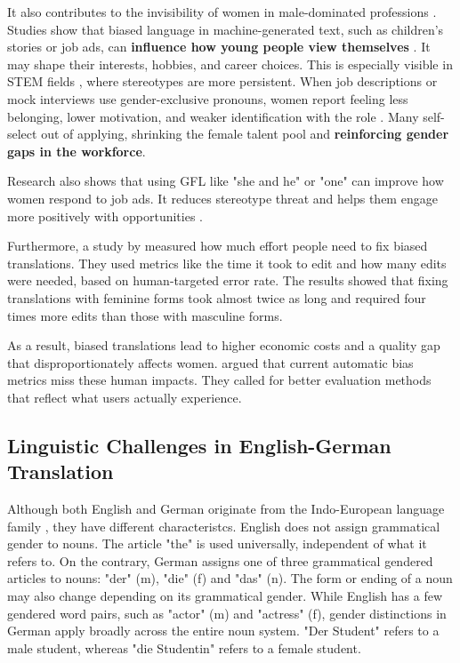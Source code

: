         It also contributes to the invisibility of women in male-dominated professions \citep{kapplAreAllSpanish2025}. Studies show that biased language in machine-generated text, such as children’s stories or job ads, can \textbf{influence how young people view themselves} \citep{soundararajanInvestigatingGenderBias2024,kapplAreAllSpanish2025}. It may shape their interests, hobbies, and career choices. This is especially visible in STEM fields \citep{pratesAssessingGenderBias2019}, where stereotypes are more persistent. When job descriptions or mock interviews use gender-exclusive pronouns, women report feeling less belonging, lower motivation, and weaker identification with the role \citep{godsilEffectsGenderRoles2016}. Many self-select out of applying, shrinking the female talent pool and \textbf{reinforcing gender gaps in the workforce}.

        Research also shows that using GFL like "she and he" or "one" can improve how women respond to job ads. It reduces stereotype threat and helps them engage more positively with opportunities \citep{godsilEffectsGenderRoles2016}.

        Furthermore, a study by \citet{savoldiWhatHarmQuantifying2024} measured how much effort people need to fix biased translations. They used metrics like the time it took to edit and how many edits were needed, based on human-targeted error rate. The results showed that fixing translations with feminine forms took almost twice as long and required four times more edits than those with masculine forms.

        As a result, biased translations lead to higher economic costs and a quality gap that disproportionately affects women. \citeauthor{savoldiWhatHarmQuantifying2024} argued that current automatic bias metrics miss these human impacts. They called for better evaluation methods that reflect what users actually experience.

    \subsection{Linguistic Challenges in English-German Translation}
        Although both English and German originate from the Indo-European language family \citep{baldiEnglishIndoEuropeanLanguage2008}, they have different characteristcs. English does not assign grammatical gender to nouns. The article "the" is used universally, independent of what it refers to. On the contrary, German assigns one of three grammatical gendered articles to nouns: "der" (m), "die" (f) and "das" (n). The form or ending of a noun may also change depending on its grammatical gender. While English has a few gendered word pairs, such as "actor" (m) and "actress" (f), gender distinctions in German apply broadly across the entire noun system. "Der Student" refers to a male student, whereas "die Studentin" refers to a female student. 

